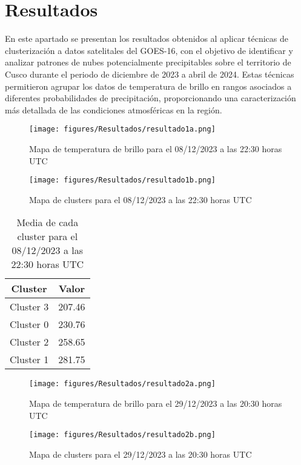 \documentclass[twocolumn]{IECEjournal} %
\begin{document}
\section{Resultados}
En este apartado se presentan los resultados obtenidos al aplicar técnicas de clusterización a datos satelitales del GOES-16, con el objetivo de identificar y analizar patrones de nubes potencialmente precipitables sobre el territorio de Cusco durante el periodo de diciembre de 2023 a abril de 2024. Estas técnicas permitieron agrupar los datos de temperatura de brillo en rangos asociados a diferentes probabilidades de precipitación, proporcionando una caracterización más detallada de las condiciones atmosféricas en la región.

\begin{figure}[H]
	\centering
	\texttt{[image: figures/Resultados/resultado1a.png]}
	\caption{Mapa de temperatura de brillo para el 08/12/2023 a las 22:30 horas UTC}
	\label{fig4}
\end{figure}

\begin{figure}[H]
	\centering
	\texttt{[image: figures/Resultados/resultado1b.png]}
	\caption{Mapa de clusters para el 08/12/2023 a las 22:30 horas UTC}
	\label{fig5}
\end{figure}

\begin{table}[h!]
    \centering
    \label{tab4}
    \begin{tabular}{|c|c|}
    \hline
    \textbf{Cluster} & \textbf{Valor} \\
    \hline
    Cluster 3 & 207.46 \\
    Cluster 0 & 230.76 \\
    Cluster 2 & 258.65 \\
    Cluster 1 & 281.75 \\
    \hline
    \end{tabular}
    \caption{Media de cada cluster para el 08/12/2023 a las 22:30 horas UTC}
\end{table}

\begin{figure}[H]
	\centering
	\texttt{[image: figures/Resultados/resultado2a.png]}
	\caption{Mapa de temperatura de brillo para el 29/12/2023 a las 20:30 horas UTC}
	\label{fig6}
\end{figure}

\begin{figure}[H]
	\centering
	\texttt{[image: figures/Resultados/resultado2b.png]}
	\caption{Mapa de clusters para el 29/12/2023 a las 20:30 horas UTC}
	\label{fig7}
\end{figure}
\end{document}
